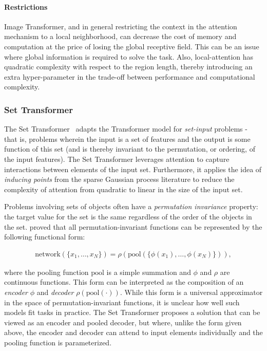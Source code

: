 \paragraph{Restrictions}
Image Transformer, and in general restricting the context in the attention mechanism to a local neighborhood, can decrease the cost of memory and computation at the price of losing the global receptive field. This can be an issue where global information is required to solve the task.  Also, local-attention has quadratic complexity with respect to the region length, thereby introducing an extra hyper-parameter in the trade-off between performance and computational complexity.

\subsubsection{Set Transformer} The Set Transformer~\citep{lee2019set} adapts the Transformer model for \emph{set-input} problems - that is, problems wherein the input is a set of features and the output is some function of this set (and is thereby invariant to the permutation, or ordering, of the input features). The Set Transformer leverages attention to capture interactions between elements of the input set. Furthermore, it applies the idea of \emph{inducing points} from the sparse Gaussian process literature to reduce the complexity of attention from quadratic to linear in the size of the input set.

Problems involving sets of objects often have a \emph{permutation invariance} property: the target value for the set is the same regardless of the order of the objects in the set. \citet{zaheer2017deep} proved that all permutation-invariant functions can be represented by the following functional form:

\begin{align*}
\text{network}\left(\{x_1,\dots, x_N\}\right) = \rho\left(\text{pool}\left(\{\phi(x_1),\dots,\phi(x_N)\}\right)\right),
\end{align*}

where the pooling function $\text{pool}$ is a simple summation and $\phi$ and $\rho$ are continuous functions. This form can be interpreted as the composition of an \emph{encoder} $\phi$ and \emph{decoder} $\rho\left(\text{pool}(\cdot)\right)$.
While this form is a universal approximator in the space of permutation-invariant functions, it is unclear how well such models fit tasks in practice. The Set Transformer proposes a solution that can be viewed as an encoder and pooled decoder, but where, unlike the form given above, the encoder and decoder can attend to input elements individually and the pooling function is parameterized.
